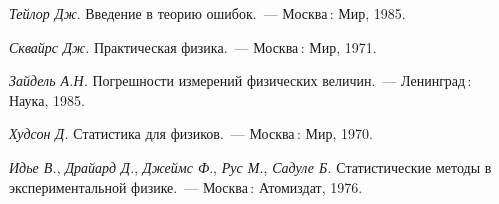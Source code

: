 \documentclass[a5paper,10pt,oneside]{report}
\begin{document}






% 



%

\begin{thebibliography}{1}

 \textit{Тейлор Дж}. Введение в теорию ошибок.~---
    Москва\,: Мир, 1985.

 \textit{Сквайрс Дж.} Практическая физика.~--- Москва\,: Мир, 1971.

 \textit{Зайдель А.Н.} 
Погрешности измерений физических величин.~--- Ленинград\,: Наука, 1985.


 \textit{Худсон Д.} Статистика для физиков.~---
    Москва\,: Мир, 1970.

 \textit{Идье В.}, \textit{Драйард Д.}, \textit{Джеймс Ф}., \textit{Рус М.}, \textit{Садуле Б.} Статистические методы в экспериментальной физике.~--- Москва\,: Атомиздат, 1976. 


\end{thebibliography}
\end{document}
